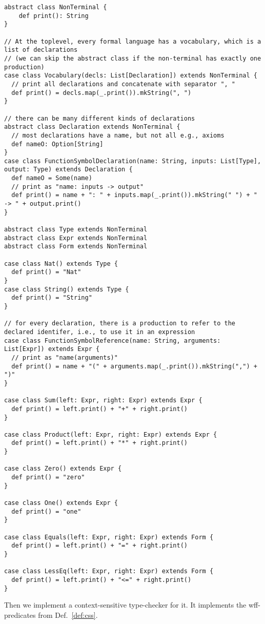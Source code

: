 \begin{lstlisting}
abstract class NonTerminal {
    def print(): String
}

// At the toplevel, every formal language has a vocabulary, which is a list of declarations
// (we can skip the abstract class if the non-terminal has exactly one production)
case class Vocabulary(decls: List[Declaration]) extends NonTerminal {
  // print all declarations and concatenate with separator ", "
  def print() = decls.map(_.print()).mkString(", ")
}

// there can be many different kinds of declarations
abstract class Declaration extends NonTerminal {
  // most declarations have a name, but not all e.g., axioms
  def nameO: Option[String]
}
case class FunctionSymbolDeclaration(name: String, inputs: List[Type], output: Type) extends Declaration {
  def nameO = Some(name)
  // print as "name: inputs -> output"
  def print() = name + ": " + inputs.map(_.print()).mkString(" ") + " -> " + output.print()
}

abstract class Type extends NonTerminal
abstract class Expr extends NonTerminal
abstract class Form extends NonTerminal

case class Nat() extends Type {
  def print() = "Nat"
}
case class String() extends Type {
  def print() = "String"
}

// for every declaration, there is a production to refer to the declared identifer, i.e., to use it in an expression
case class FunctionSymbolReference(name: String, arguments: List[Expr]) extends Expr {
  // print as "name(arguments)"
  def print() = name + "(" + arguments.map(_.print()).mkString(",") + ")"
}

case class Sum(left: Expr, right: Expr) extends Expr {
  def print() = left.print() + "+" + right.print()
}  

case class Product(left: Expr, right: Expr) extends Expr {
  def print() = left.print() + "*" + right.print()
}  

case class Zero() extends Expr {
  def print() = "zero"
}

case class One() extends Expr {
  def print() = "one"
}

case class Equals(left: Expr, right: Expr) extends Form {
  def print() = left.print() + "=" + right.print()
}  

case class LessEq(left: Expr, right: Expr) extends Form {
  def print() = left.print() + "<=" + right.print()
}
\end{lstlisting}

Then we implement a context-sensitive type-checker for it.
It implements the wff-predicates from Def.~\ref{def:css}.

